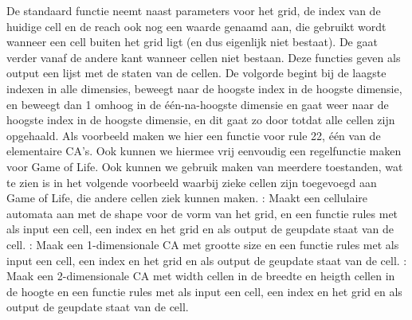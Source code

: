 {}De standaard  functie neemt naast parameters voor het grid, de index van de huidige cell en de reach ook nog een waarde genaamd  aan, die gebruikt wordt wanneer een cell buiten het grid ligt (en dus eigenlijk niet bestaat).\markdownRendererInterblockSeparator
{}De  gaat verder vanaf de andere kant wanneer cellen niet bestaan.\markdownRendererInterblockSeparator
{}Deze functies geven als output een lijst met de staten van de cellen. De volgorde begint bij de laagste indexen in alle dimensies, beweegt naar de hoogste index in de hoogste dimensie, en beweegt dan 1 omhoog in de één-na-hoogste dimensie en gaat weer naar de hoogste index in de hoogste dimensie, en dit gaat zo door totdat alle cellen zijn opgehaald.\markdownRendererInterblockSeparator
{}Als voorbeeld maken we hier een functie voor rule 22, één van de elementaire CA's.\markdownRendererInterblockSeparator
{}\markdownRendererInterblockSeparator
{}Ook kunnen we hiermee vrij eenvoudig een regelfunctie maken voor Game of Life.\markdownRendererInterblockSeparator
{}\markdownRendererInterblockSeparator
{}Ook kunnen we gebruik maken van meerdere toestanden, wat te zien is in het volgende voorbeeld waarbij zieke cellen zijn toegevoegd aan Game of Life, die andere cellen ziek kunnen maken.\markdownRendererInterblockSeparator
{}\markdownRendererInterblockSeparator
{}\markdownRendererInterblockSeparator
{}: Maakt een cellulaire automata aan met de shape voor de vorm van het grid, en een functie rules met als input een cell, een index en het grid en als output de geupdate staat van de cell.\markdownRendererInterblockSeparator
{}: Maak een 1-dimensionale CA met grootte size en een functie rules met als input een cell, een index en het grid en als output de geupdate staat van de cell.\markdownRendererInterblockSeparator
{}: Maak een 2-dimensionale CA met width cellen in de breedte en heigth cellen in de hoogte en een functie rules met als input een cell, een index en het grid en als output de geupdate staat van de cell.\markdownRendererInterblockSeparator
